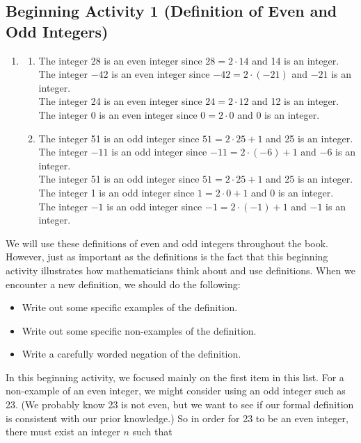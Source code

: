 \documentclass[11pt]{article}
\begin{document}
\subsection*{Beginning Activity 1 (Definition of Even and Odd Integers)}
\begin{enumerate}
\item \begin{enumerate}
\item The integer 28 is an even integer since $28 = 2 \cdot 14$ and 14 is an integer. \\
The integer $-42$ is an even integer since $-42 = 2 \cdot (-21)$ and $-21$ is an integer. \\
The integer 24 is an even integer since $24 = 2 \cdot 12$ and 12 is an integer. \\
The integer 0 is an even integer since $0 = 2 \cdot 0$ and 0 is an integer. \\

\item The integer 51 is an odd integer since $51 = 2 \cdot 25 + 1$ and 25 is an integer. \\
The integer $-11$ is an odd integer since $-11 = 2 \cdot (-6) + 1$ and $-6$ is an integer. \\
The integer 51 is an odd integer since $51 = 2 \cdot 25 + 1$ and 25 is an integer. \\
The integer 1 is an odd integer since $1 = 2 \cdot 0 + 1$ and 0 is an integer. \\
The integer $-1$ is an odd integer since $-1 = 2 \cdot (-1) + 1$ and $-1$ is an integer. \\
\end{enumerate}
\end{enumerate}
We will use these definitions of even and odd integers throughout the book.  However, just as important as the definitions is the fact that this beginning activity illustrates how mathematicians think about and use definitions.  When we encounter a new definition, we should do the following:
\begin{itemize}
  \item Write out some specific examples of the definition.
  \item Write out some specific non-examples of the definition.
  \item Write a carefully worded negation of the definition.
\end{itemize}
In this beginning activity, we focused mainly on the first item in this list.  For a non-example of an even integer, we might consider using an odd integer such as 23.  (We probably know 23 is not even, but we want to see if our formal definition is consistent with our prior knowledge.)  So in order for 23 to be an even integer, there must exist an integer $n$ such that
\end{document}
